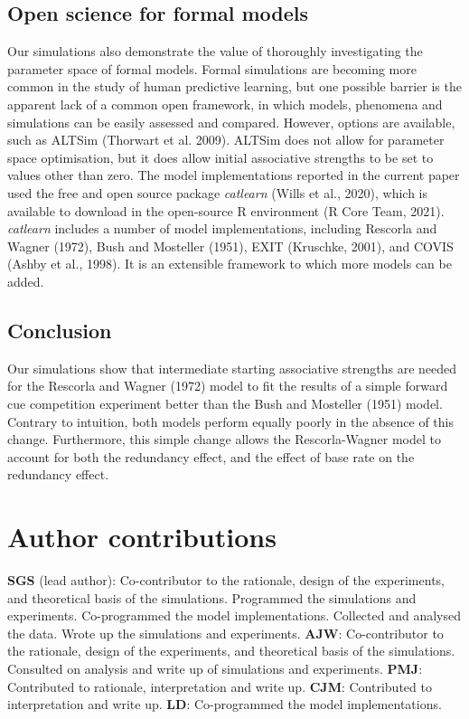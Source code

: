\documentclass[twocolumn]{article}
\begin{document}
\subsection{Open science for formal models}

Our simulations also
demonstrate the value of thoroughly investigating the parameter space of
formal models. Formal simulations are becoming more common in the study
of human predictive learning, but one possible barrier is the apparent
lack of a common open framework, in which models, phenomena and
simulations can be easily assessed and compared. However, options are
available, such as ALTSim (Thorwart et al. 2009). ALTSim does not allow
for parameter space optimisation, but it does allow initial associative
strengths to be set to values other than zero. The model implementations
reported in the current paper used the free and open source package
\emph{catlearn }(Wills et al., 2020), which is available to download in
the open-source R environment (R Core Team, 2021). \emph{catlearn}
includes a number of model implementations, including Rescorla and
Wagner (1972), Bush and Mosteller (1951), EXIT (Kruschke, 2001), and
COVIS (Ashby et al., 1998). It is an extensible framework to which more
models can be added.

\subsection{Conclusion}

Our simulations show that intermediate starting
associative strengths are needed for the Rescorla and Wagner (1972)
model to fit the results of a simple forward cue competition experiment
better than the Bush and Mosteller (1951) model. Contrary to intuition,
both models perform equally poorly in the absence of this change.
Furthermore, this simple change allows the Rescorla-Wagner model to
account for both the redundancy effect, and the effect of base rate on
the redundancy effect.

\section*{Author contributions}

\textbf{SGS} (lead author): Co-contributor to the rationale, design of the
experiments, and theoretical basis of the simulations. Programmed the
simulations and experiments. Co-programmed the model implementations. Collected
and analysed the data.  Wrote up the simulations and
experiments. \textbf{AJW}: Co-contributor to the rationale, design of the
experiments, and theoretical basis of the simulations. Consulted on analysis
and write up of simulations and experiments.
\textbf{PMJ}: Contributed to rationale, interpretation and write up.
\textbf{CJM}: Contributed to interpretation and write up.
\textbf{LD}: Co-programmed the model implementations.
\end{document}
